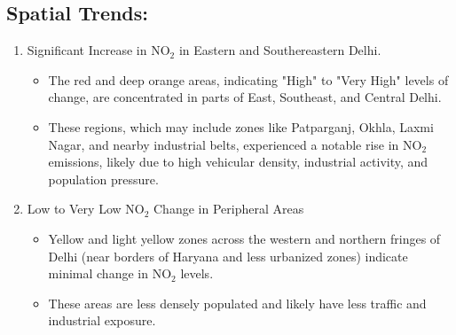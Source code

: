 \documentclass[12pt]{report}
\begin{document}
\subsection{Spatial Trends:}
\begin{enumerate}
    \item Significant Increase in NO$_2$ in Eastern and Southereastern Delhi.
    \begin{itemize}
        \item The red and deep orange areas, indicating "High" to "Very High" levels of change, are concentrated in parts of East, Southeast, and Central Delhi.
        \item These regions, which may include zones like Patparganj, Okhla, Laxmi Nagar, and nearby industrial belts, experienced a notable rise in NO$_2$ emissions, likely due to high vehicular density, industrial activity, and population pressure.
    \end{itemize}
    \item Low to Very Low NO$_2$ Change in Peripheral Areas
    \begin{itemize}
        \item Yellow and light yellow zones across the western and northern fringes of Delhi (near borders of Haryana and less urbanized zones) indicate minimal change in NO$_2$ levels.
        \item These areas are less densely populated and likely have less traffic and industrial exposure.
    \end{itemize}
\end{enumerate}
\end{document}
